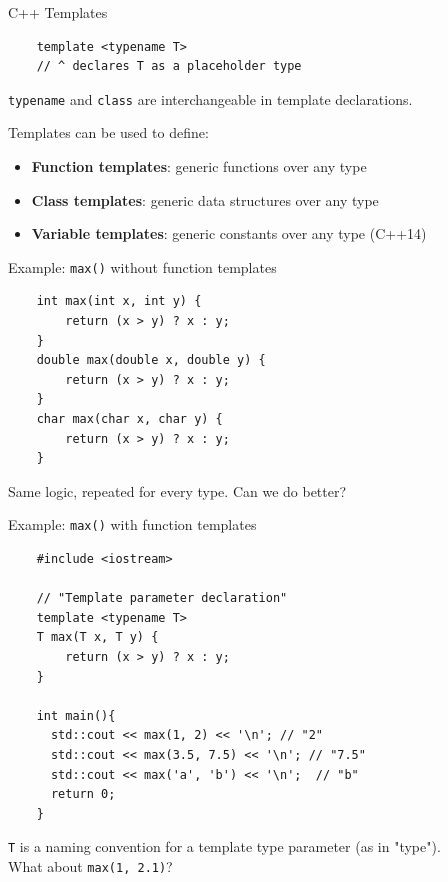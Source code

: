 \begin{frame}[fragile]{C++ Templates}
  \begin{verbatim}
    template <typename T>
    // ^ declares T as a placeholder type
  \end{verbatim}

  \texttt{typename} and \texttt{class} are interchangeable in template declarations.

  \vspace{0.4cm}
  Templates can be used to define:
  \begin{itemize}
    \item \textbf{Function templates}: generic functions over any type
    \item \textbf{Class templates}: generic data structures over any type
    \item \textbf{Variable templates}: generic constants over any type (C++14)
  \end{itemize}
\end{frame}

\begin{frame}[fragile]{Example: \texttt{max()} without function templates}
  \begin{verbatim}
    int max(int x, int y) {
        return (x > y) ? x : y;
    }
    double max(double x, double y) {
        return (x > y) ? x : y;
    }
    char max(char x, char y) {
        return (x > y) ? x : y;
    }
  \end{verbatim}

  Same logic, repeated for every type. Can we do better?
\end{frame}


\begin{frame}[fragile]{Example: \texttt{max()} with function templates}
  \begin{verbatim}
    #include <iostream>

    // "Template parameter declaration"
    template <typename T> 
    T max(T x, T y) {
        return (x > y) ? x : y;
    }

    int main(){
      std::cout << max(1, 2) << '\n'; // "2"
      std::cout << max(3.5, 7.5) << '\n'; // "7.5"
      std::cout << max('a', 'b') << '\n';  // "b"
      return 0;
    }

  \end{verbatim}

  \texttt{T} is a naming convention for a template type parameter (as in "type"). \\
  What about \texttt{max(1, 2.1)}?
\end{frame}

